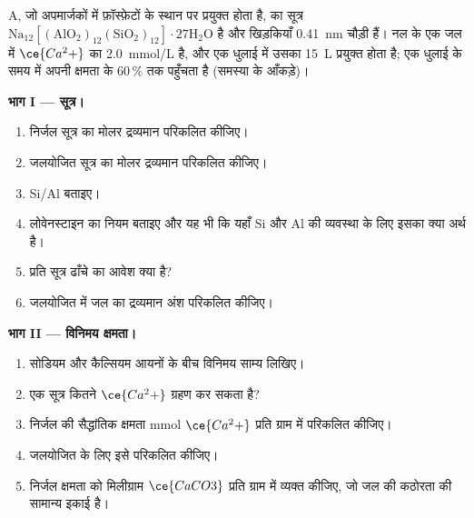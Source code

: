 \begin{problem}
\label{pb:b3:inorganic-materials:1}
 A, जो अपमार्जकों में फ़ॉस्फ़ेटों के स्थान पर प्रयुक्त होता है, का सूत्र
$\mathrm{Na_{12}[(AlO_2)_{12}(SiO_2)_{12}]\cdot 27H_2O}$ है और खिड़कियाँ \qty{0.41}{nm} चौड़ी हैं। नल के एक जल में
$\ce{Ca^2+}$ का \qty{2.0}{mmol/L} है, और एक धुलाई में उसका \qty{15}{L} प्रयुक्त होता है; एक धुलाई के समय में 
अपनी क्षमता के 60\,\% तक पहुँचता है (समस्या के आँकड़े)।

\medskip\noindent\textbf{भाग I --- सूत्र।}
\begin{enumerate}
  \item निर्जल सूत्र का मोलर द्रव्यमान परिकलित कीजिए।
  \item जलयोजित सूत्र का मोलर द्रव्यमान परिकलित कीजिए।
  \item Si/Al बताइए।
  \item लोवेनस्टाइन का नियम बताइए और यह भी कि यहाँ Si और Al की व्यवस्था के लिए
        इसका क्या अर्थ है।
  \item प्रति सूत्र ढाँचे का आवेश क्या है?
  \item जलयोजित  में जल का द्रव्यमान अंश परिकलित कीजिए।
\end{enumerate}

\medskip\noindent\textbf{भाग II --- विनिमय क्षमता।}
\begin{enumerate}[resume]
  \item सोडियम  और कैल्सियम
        आयनों के बीच विनिमय साम्य लिखिए।
  \item एक सूत्र कितने $\ce{Ca^2+}$ ग्रहण कर सकता है?
  \item निर्जल  की सैद्धांतिक क्षमता mmol $\ce{Ca^2+}$
        प्रति ग्राम में परिकलित कीजिए।
  \item जलयोजित  के लिए इसे परिकलित कीजिए।
  \item निर्जल क्षमता को मिलीग्राम $\ce{CaCO3}$ प्रति ग्राम में व्यक्त कीजिए, जो जल की कठोरता की सामान्य
        इकाई है।
\end{enumerate}


\end{problem}

